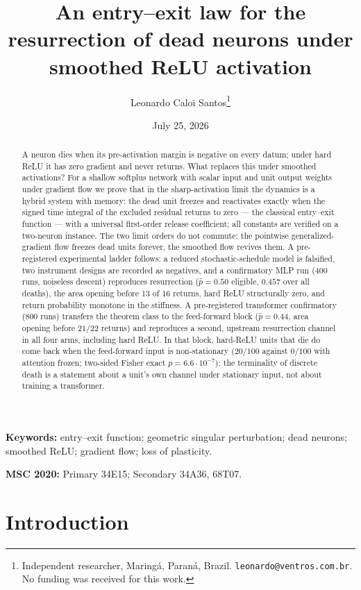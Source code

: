 \documentclass[11pt]{article}
\title{An entry--exit law for the resurrection of dead neurons
under smoothed ReLU activation}
\author{Leonardo Caloi Santos\thanks{Independent researcher, Maring\'a,
Paran\'a, Brazil. \texttt{leonardo@ventros.com.br}. No funding was received
for this work.}}
\date{July 25, 2026}
\theoremstyle{definition}
\theoremstyle{remark}
\begin{document}
\maketitle

\begin{abstract}
A neuron dies when its pre-activation margin is negative on every datum; under
hard ReLU it has zero gradient and never returns. What replaces this under
smoothed activations? For a shallow softplus network with scalar input and
unit output weights under gradient flow we prove that in the sharp-activation
limit the dynamics is a hybrid system with memory: the dead unit freezes and
reactivates exactly when the signed time integral of the excluded residual
returns to zero --- the classical entry--exit function --- with a universal
first-order release coefficient; all constants are verified on a two-neuron
instance. The
two limit orders do not commute: the
pointwise generalized-gradient flow freezes dead units forever, the smoothed flow
revives them. A pre-registered experimental ladder follows: a reduced stochastic-schedule
model is falsified, two instrument designs are recorded as negatives, and a
confirmatory MLP run (400 runs, noiseless descent) reproduces resurrection
($\hat p=0.50$ eligible, $0.457$ over all deaths), the area opening before 13
of 16 returns, hard ReLU structurally zero, and return probability monotone in
the stiffness. A pre-registered transformer confirmatory ($800$ runs)
transfers the theorem class to the feed-forward block ($\hat p=0.44$, area
opening before $21/22$ returns) and reproduces a second, upstream resurrection
channel in all four arms, including hard ReLU. In that block, hard-ReLU units
that die do come back when the feed-forward input is non-stationary ($20/100$
against $0/100$ with attention frozen; two-sided Fisher exact
$p=6.6\cdot10^{-7}$): the terminality of discrete death is a statement about a
unit's own channel under stationary input, not about training a transformer.
\end{abstract}

\noindent\textbf{Keywords:} entry--exit function; geometric singular
perturbation; dead neurons; smoothed ReLU; gradient flow; loss of plasticity.

\smallskip
\noindent\textbf{MSC 2020:} Primary 34E15; Secondary 34A36, 68T07.

\section{Introduction}\label{sec:intro}
\end{document}

